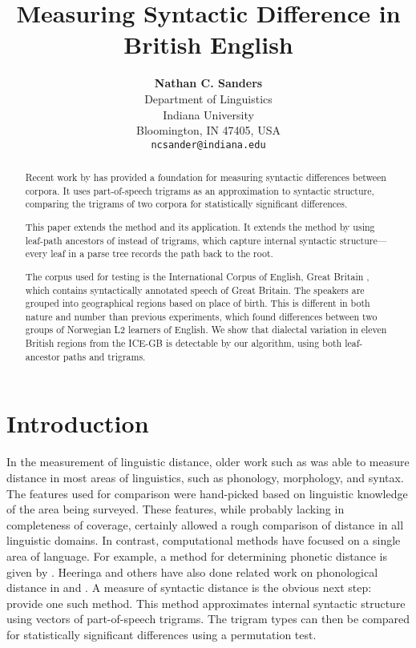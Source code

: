 \documentclass[11pt,letterpaper]{article}
\author{\textbf{Nathan C. Sanders} \\ Department of Linguistics \\
  Indiana University \\
  Bloomington, IN 47405, USA \\ \texttt{ncsander@indiana.edu}}
\title{Measuring Syntactic Difference in British English}
\begin{document}
\maketitle
\begin{abstract}Recent work by
   has provided a foundation for measuring
  syntactic differences between corpora. It uses part-of-speech trigrams as an
  approximation to syntactic structure, comparing the trigrams of two
  corpora for statistically significant differences.

  This paper extends the method and its application. It extends the
  method by using leaf-path ancestors of  instead of
  trigrams, which capture internal syntactic structure---every leaf in
  a parse tree records the path back to the root.

  The corpus used for testing is the International Corpus of English,
  Great Britain \cite{nelson02}, which contains syntactically
  annotated speech of Great Britain. The speakers are grouped into
  geographical regions based on place of birth. This is different in
  both nature and number than previous experiments, which found
  differences between two groups of Norwegian L2 learners of
  English. We show that dialectal variation in eleven British regions from the ICE-GB
  is detectable by our algorithm, using both leaf-ancestor paths and trigrams.
\end{abstract}

\section{Introduction}
In the measurement of linguistic distance, older work such as
 was able to measure distance in most areas of
linguistics, such as phonology, morphology, and syntax. The
features used for comparison were hand-picked based on
linguistic knowledge of the area being surveyed. These features,
while probably lacking in completeness of coverage, certainly allowed
a rough comparison of distance in all linguistic domains.
In contrast, computational methods have
focused on a single area of language. For example, a method for
determining phonetic distance is given by . Heeringa
and others have also done related work on phonological distance in
 and . A measure of syntactic
distance is the obvious next step:  provide one such
method. This method approximates internal syntactic structure using
vectors of part-of-speech trigrams. The trigram types can then be
compared for statistically significant differences using a permutation
test.
\end{document}
